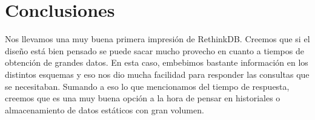 \section{Conclusiones}

\par Nos llevamos una muy buena primera impresión de RethinkDB.
Creemos que si el diseño está bien pensado se puede sacar mucho provecho en cuanto a tiempos de obtención de grandes datos.
En esta caso, embebimos bastante información en los distintos esquemas y eso nos dio mucha facilidad para responder las consultas que se necesitaban.
Sumando a eso lo que mencionamos del tiempo de respuesta, creemos que es una muy buena opción a la hora de pensar en historiales o almacenamiento de datos estáticos con gran volumen.
